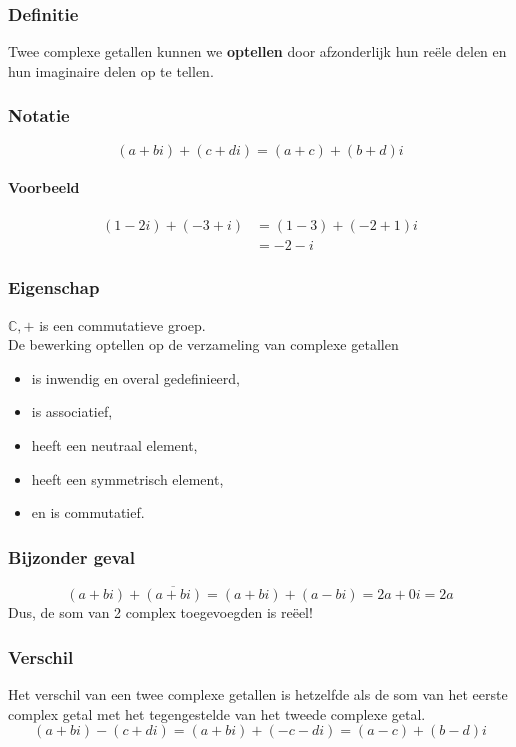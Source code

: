 \documentclass[12pt,twoside,a4]{article}
\begin{document}
\subsubsection*{Definitie}
\begin{mdframed}
Twee complexe getallen kunnen we {\bf optellen} door afzonderlijk hun reële delen en hun imaginaire delen op te tellen.
\end{mdframed}

\subsubsection*{Notatie}
$$(a+bi) + (c+di) = (a+c) + (b+d)i$$

\paragraph{Voorbeeld}
\begin{align*}
  (1 - 2i) + (-3 + i) &= (1 - 3) + (-2 + 1)i \\
                      &= -2-i
\end{align*}

\subsubsection*{Eigenschap}
$\mathbb{C},+$ is een commutatieve groep.\\
De bewerking optellen op de verzameling van complexe getallen
\begin{itemize}
  \item is inwendig en overal gedefinieerd,
  \item is associatief,
  \item heeft een neutraal element,
  \item heeft een symmetrisch element,
  \item en is commutatief.
\end{itemize}

\subsubsection*{Bijzonder geval}
\[(a+bi) + \overline{(a+bi)}=(a+bi) + (a-bi) = 2a+0i = 2a\]
Dus, de som van 2 complex toegevoegden is reëel!

\subsubsection*{Verschil}
Het verschil van een twee complexe getallen is hetzelfde als de som van het eerste complex getal met het tegengestelde van het tweede complexe getal.
\[(a+bi)-(c+di)=(a+bi)+(-c-di)=(a-c)+(b-d)i\]
\end{document}
